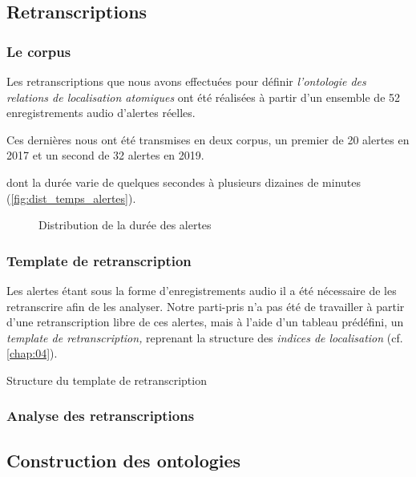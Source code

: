 
\subsection{Retranscriptions}

\subsubsection{Le corpus}

Les retranscriptions que nous avons effectuées pour définir
\emph{l'ontologie des relations de localisation atomiques} ont été
réalisées à partir d'un ensemble de 52 enregistrements audio d'alertes
réelles.

Ces dernières nous ont été transmises en deux corpus, un premier de 20
alertes en 2017 et un second de 32 alertes en 2019.

 dont la durée varie de quelques secondes à plusieurs dizaines
de minutes (\autoref{fig:dist_temps_alertes}).

\begin{figure}
  \centering
  
  \caption{Distribution de la durée des alertes}
  \label{fig:dist_temps_alertes}
\end{figure}

\subsubsection{Template de retranscription}

Les alertes étant sous la forme d'enregistrements audio il a été
nécessaire de les retranscrire afin de les analyser.
%
Notre parti-pris n'a pas été de travailler à partir d'une
retranscription libre de ces alertes, mais à l'aide d'un tableau
prédéfini, un \emph{template de retranscription,} reprenant la
structure des \emph{indices de localisation} (cf. \autoref{chap:04}).


\begin{table}
  \centering
  
  \caption{Structure du template de retranscription}
  \label{tab:struct_temp}
\end{table}

\subsubsection{Analyse des retranscriptions}

\subsection{Construction des ontologies}

